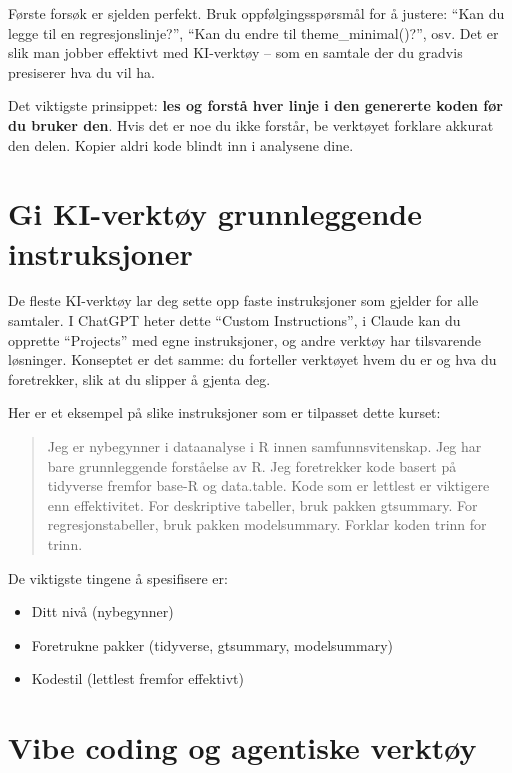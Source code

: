 \documentclass[
  norsk,
  letterpaper,
  DIV=11,
  numbers=noendperiod]{scrreprt}
\providecommand{\tightlist}{%
  \setlength{\itemsep}{0pt}\setlength{\parskip}{0pt}}
\theoremstyle{definition}
\theoremstyle{remark}
\begin{document}
Første forsøk er sjelden perfekt. Bruk oppfølgingsspørsmål for å
justere: ``Kan du legge til en regresjonslinje?'', ``Kan du endre til
theme\_minimal()?'', osv. Det er slik man jobber effektivt med
KI-verktøy -- som en samtale der du gradvis presiserer hva du vil ha.

Det viktigste prinsippet: \textbf{les og forstå hver linje i den
genererte koden før du bruker den}. Hvis det er noe du ikke forstår, be
verktøyet forklare akkurat den delen. Kopier aldri kode blindt inn i
analysene dine.

\section{Gi KI-verktøy grunnleggende
instruksjoner}\label{gi-ki-verktuxf8y-grunnleggende-instruksjoner}

De fleste KI-verktøy lar deg sette opp faste instruksjoner som gjelder
for alle samtaler. I ChatGPT heter dette ``Custom Instructions'', i
Claude kan du opprette ``Projects'' med egne instruksjoner, og andre
verktøy har tilsvarende løsninger. Konseptet er det samme: du forteller
verktøyet hvem du er og hva du foretrekker, slik at du slipper å gjenta
deg.

Her er et eksempel på slike instruksjoner som er tilpasset dette kurset:

\begin{quote}
Jeg er nybegynner i dataanalyse i R innen samfunnsvitenskap. Jeg har
bare grunnleggende forståelse av R. Jeg foretrekker kode basert på
tidyverse fremfor base-R og data.table. Kode som er lettlest er
viktigere enn effektivitet. For deskriptive tabeller, bruk pakken
gtsummary. For regresjonstabeller, bruk pakken modelsummary. Forklar
koden trinn for trinn.
\end{quote}

De viktigste tingene å spesifisere er:

\begin{itemize}
\tightlist
\item
  Ditt nivå (nybegynner)
\item
  Foretrukne pakker (tidyverse, gtsummary, modelsummary)
\item
  Kodestil (lettlest fremfor effektivt)
\end{itemize}

\section{Vibe coding og agentiske
verktøy}\label{vibe-coding-og-agentiske-verktuxf8y}
\end{document}
